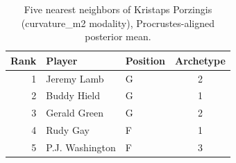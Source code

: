 \begin{table}[htbp]
  \centering\small
  \begin{tabular}{rllc}
    \toprule
    Rank & Player & Position & Archetype \\
    \midrule
    1 & Jeremy Lamb & G & 2 \\
    2 & Buddy Hield & G & 1 \\
    3 & Gerald Green & G & 2 \\
    4 & Rudy Gay & F & 1 \\
    5 & P.J. Washington & F & 3 \\
    \bottomrule
  \end{tabular}
  \caption{Five nearest neighbors of Kristaps Porzingis (curvature_m2 modality), Procrustes-aligned posterior mean.}
  \label{tab:Kristaps_Porzingis_neighbors_curvature_m2}
\end{table}

